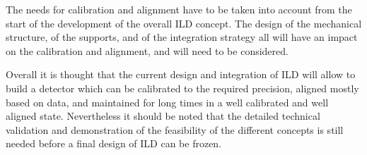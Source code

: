 The needs for calibration and alignment have to be taken into account from the start of the development of the overall ILD concept. The design of the mechanical structure, of the supports, and of the integration strategy all will have an impact on the calibration and alignment, and will need to be considered. 

Overall it is thought that the current design and integration of ILD will allow to build a detector which can be calibrated to the required precision, aligned mostly based on data, and maintained for long times in a well calibrated and well aligned state. Nevertheless it should be noted that the detailed technical validation and demonstration of the feasibility of the different concepts is still needed before a final design of ILD can be frozen. 
